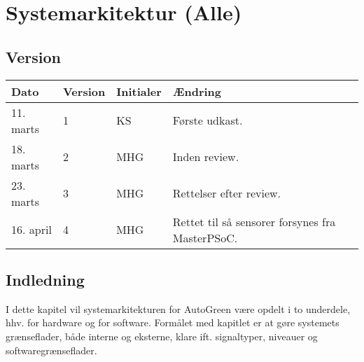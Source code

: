 \chapter{Systemarkitektur (Alle)}

\section{Version}
\begin{table}[h]
	\centering
	\begin{tabularx}{\textwidth - 2cm}{|l|l|l|X|}
	\hline
	Dato	& Version	& Initialer & Ændring	\\ \hline
	11. marts & 1 & KS & Første udkast. \\ \hline
	18. marts & 2 & MHG & Inden review. \\\hline
	23. marts & 3 & MHG & Rettelser efter review. \\\hline		
	16. april & 4 & MHG & Rettet til så \IIC sensorer forsynes fra MasterPSoC. \\\hline 
	\end{tabularx}
\end{table}

\section{Indledning}

I dette kapitel vil systemarkitekturen for AutoGreen være opdelt i to underdele, hhv. for hardware og for software. Formålet med kapitlet er at gøre systemets grænseflader, både interne og eksterne, klare ift. signaltyper, niveauer og softwaregrænseflader.







